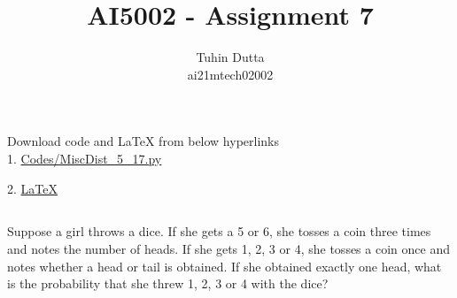 \documentclass[journal,12pt,twocolumn]{IEEEtran}
\begin{document}
\providecommand{\mtx}[1]{\mathbf{#1}}
\providecommand{\fourier}{\overset{\mathcal{F}}{ \rightleftharpoons}}
\providecommand{\system}{\overset{\mathcal{H}}{ \longleftrightarrow}}
\newcommand{\solution}{\noindent \textbf{Solution: }}
\newcommand{\cosec}{\,\text{cosec}\,}
\providecommand{\dec}[2]{\ensuremath{\overset{#1}{\underset{#2}{\gtrless}}}}
\newcommand{\myvec}[1]{\ensuremath{\begin{pmatrix}#1\end{pmatrix}}}
\newcommand{\mydet}[1]{\ensuremath{\begin{vmatrix}#1\end{vmatrix}}}
\makeatletter
{}
\makeatother
\let\StandardTheFigure\thefigure
\let\vec\mathbf
\renewcommand{\thefigure}{\theproblem}
\def\putbox#1#2#3{\makebox[0in][l]{\makebox[#1][l]{}\raisebox{\baselineskip}[0in][0in]{\raisebox{#2}[0in][0in]{#3}}}}
     \def\rightbox#1{\makebox[0in][r]{#1}}
     \def\centbox#1{\makebox[0in]{#1}}
     \def\topbox#1{\raisebox{-\baselineskip}[0in][0in]{#1}}
     \def\midbox#1{\raisebox{-0.5\baselineskip}[0in][0in]{#1}}
\vspace{3cm}
\title{AI5002 - Assignment 7}
\author{Tuhin Dutta\\ ai21mtech02002}
\maketitle
\newpage
\bigskip
\renewcommand{\thefigure}{\theenumi}
\renewcommand{\thetable}{\theenumi}
\begin{mdframed}
Download code and LaTeX from below hyperlinks\\
1. \href{https://github.com/Tauhait/AI5002/blob/main/Assignment-7/Codes/MiscDist\_5\_17.py}{Codes/MiscDist\_5\_17.py}


2. \href{https://github.com/Tauhait/AI5002/tree/main/Assignment-7/LaTeX}{LaTeX}
\end{mdframed}
\subsection*{}
\begin{flushleft} Suppose a girl throws a dice. If she gets a 5 or
6, she tosses a coin three times and notes the
number of heads. If she gets 1, 2, 3 or 4, she
tosses a coin once and notes whether a head
or tail is obtained. If she obtained exactly one
head, what is the probability that she threw 1,
2, 3 or 4 with the dice? \end{flushleft}
\end{document}
